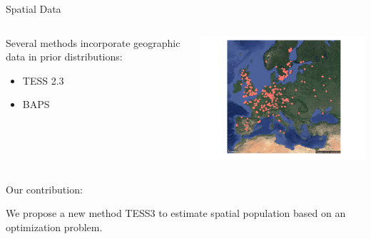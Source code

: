 \documentclass{beamer}\usepackage[]{graphicx}\usepackage[]{color}
\begin{document}
\begin{frame}{Spatial Data}

\begin{columns}
\begin{column}{0.5\textwidth}
Several methods incorporate geographic data in prior distributions:
\begin{itemize}
  \item TESS 2.3~\citep{durand2009spatial}
  \item BAPS~\citep{corander2008bayesian}
\end{itemize}

\end{column}
\begin{column}{0.5\textwidth}  %
    \begin{center}
    \includegraphics{map.pdf}
     \end{center}
\end{column}
\end{columns}

\alert{Our contribution:}

We propose a new method TESS3 to estimate spatial population based on an optimization 
problem.
\end{frame}
\end{document}
